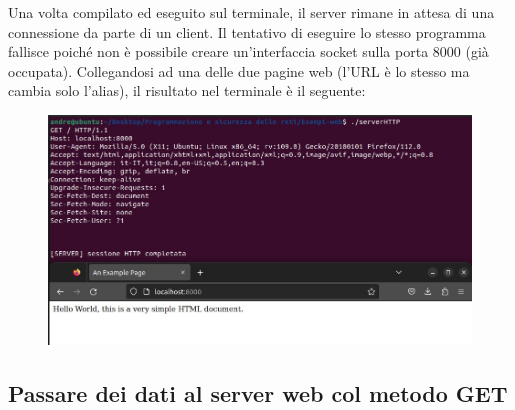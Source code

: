 \documentclass[a4paper]{article}
\begin{document}
	\noindent
	Una volta compilato ed eseguito sul terminale, il server rimane in attesa di una connessione da parte di un client. Il tentativo di eseguire lo stesso programma fallisce poiché non è possibile creare un'interfaccia socket sulla porta 8000 (già occupata). Collegandosi ad una delle due pagine web (l'URL è lo stesso ma cambia solo l'alias), il risultato nel terminale è il seguente:
	\begin{figure}[!htp]
		\centering
		\includegraphics[width=\textwidth]{img/web-server/web-server-1.jpg}
	\end{figure}\newpage
	
	\subsection{Passare dei dati al server web col metodo GET}
	
\end{document}
